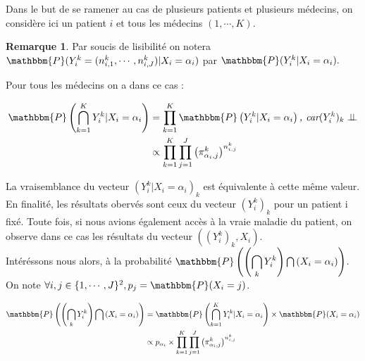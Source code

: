 \documentclass[frenchb]{report}
\newcommand{\1}{\mathbbm{1}}
\newcommand{\prob}{\mathbbm{P}}
\newcommand{\indep}{\perp \!\!\! \perp}
\theoremstyle{definition}\newtheorem{defn}{Définition}
\theoremstyle{definition}\newtheorem{exm}{Exemple}
\theoremstyle{definition}\newtheorem{nota}{Notation}
\theoremstyle{definition}\newtheorem{rem}{Remarque}
\begin{document}
Dans le but de se ramener au cas de plusieurs patients et plusieurs médecins, on considère ici un patient $i$ et tous les médecins $(1, \cdots, K)$.\\

\begin{rem}
	Par soucis de lisibilité on notera $\prob(Y^k_i = (n^k_{i,1}, \cdots, n^k_{i,J})|X_i = \alpha_i)$ par $\prob(Y^k_i|X_i = \alpha_i).$
\end{rem}

Pour tous les médecins on a dans ce cas : 
\begin{center}
	\begin{align*}
		\prob \left( \displaystyle \bigcap_{k=1}^K Y^k_i |X_i =\alpha_i \right) &= \displaystyle \prod_{k=1}^K \prob \left(Y^k_i |X_i = \alpha_i \right) \textit{, car} (Y^k_i)_k \indep\\
	&\propto \displaystyle \prod_{k=1}^K \displaystyle \prod_{j = 1}^J \left(\pi^k_{\alpha_i,j}\right)^{n^k_{i,j}}\\
	\end{align*}
\end{center}

La vraisemblance du vecteur $(Y^k_i | X_i = \alpha_i)_k$ est équivalente à cette même valeur.\\

En finalité, les résultats obervés sont ceux du vecteur $(Y^k_i)_k$ pour un patient i fixé. Toute fois, si nous avions également accès à la vraie maladie du patient, on observe dans ce cas les résultats du vecteur $((Y^k_i)_k, X_i)$.\\

Intéréssons nous alors, à la probabilité $\prob \left( \left( \displaystyle \bigcap_k Y^k_i \right) \bigcap \left(X_i = \alpha_i \right) \right)$.\\

On note $\forall i,j \in \{1, \cdots, J\}^2, p_j = \prob(X_i = j)$.\\

\begin{center}
	\begin{align*}
		\prob \left( \left( \displaystyle \bigcap_k Y^k_i \right) \bigcap \left(X_i = \alpha_i \right) \right) &= \prob \left( \displaystyle \bigcap_{k = 1}^K Y^k_i |X_i = \alpha_i \right) \times \prob(X_i = \alpha_i)\\
		& \propto p_{\alpha_i} \times \displaystyle \prod_{k=1}^K \displaystyle \prod_{j = 1}^J \left(\pi^k_{\alpha_i,j}\right)^{n^k_{i,j}}\\
	\end{align*}
\end{center}
\end{document}
